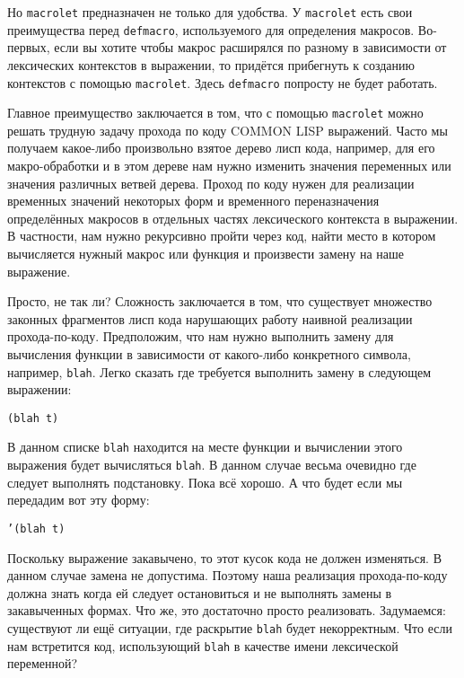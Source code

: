Но \verb"macrolet" предназначен не только для удобства. У \verb"macrolet" есть свои преимущества перед \verb"defmacro", используемого для определения макросов. Во-первых, если вы хотите чтобы макрос расширялся по разному в зависимости от лексических контекстов в выражении, то придётся прибегнуть к созданию контекстов с помощью \verb"macrolet". Здесь \verb"defmacro" попросту не будет работать.

Главное преимущество заключается в том, что с помощью \verb"macrolet" можно решать трудную задачу прохода по коду COMMON LISP выражений. Часто мы получаем какое-либо произвольно взятое дерево лисп кода, например, для его макро-обработки и в этом дереве нам нужно изменить значения переменных или значения различных ветвей дерева. Проход по коду нужен для реализации временных значений некоторых форм и временного переназначения определённых макросов в отдельных частях лексического контекста в выражении. В частности, нам нужно рекурсивно пройти через код, найти место в котором вычисляется нужный макрос или функция и произвести замену на наше выражение.

Просто, не так ли? Сложность заключается в том, что существует множество законных фрагментов лисп кода нарушающих работу наивной реализации прохода-по-коду. Предположим, что нам нужно выполнить замену для вычисления функции в зависимости от какого-либо конкретного символа, например, \verb"blah". Легко сказать где требуется выполнить замену в следующем выражении:

\begin{verbatim}
(blah t)
\end{verbatim}

В данном списке \verb"blah" находится на месте функции и вычислении этого выражения будет вычисляться \verb"blah". В данном случае весьма очевидно где следует выполнять подстановку. Пока всё хорошо. А что будет если мы передадим вот эту форму:

\begin{verbatim}
’(blah t)
\end{verbatim}

Поскольку выражение закавычено, то этот кусок кода не должен изменяться. В данном случае замена не допустима. Поэтому наша реализация прохода-по-коду должна знать когда ей следует остановиться и не выполнять замены в закавыченных формах. Что же, это достаточно просто реализовать. Задумаемся: существуют ли ещё ситуации, где раскрытие \verb"blah" будет некорректным. Что если нам встретится код, использующий \verb"blah" в качестве имени лексической переменной?

